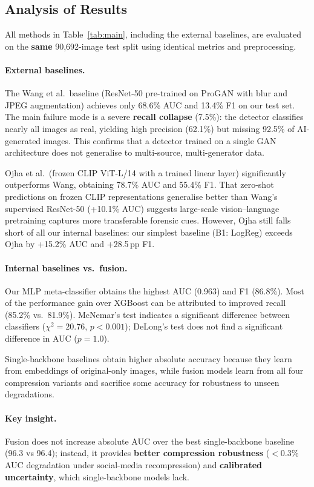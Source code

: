\subsection{Analysis of Results}

All methods in Table~\ref{tab:main}, including the external baselines, are evaluated on the \textbf{same} 90,692-image test split using identical metrics and preprocessing.

\paragraph{External baselines.}
The Wang et al.\ baseline (ResNet-50 pre-trained on ProGAN with blur and JPEG augmentation) achieves only 68.6\% AUC and 13.4\% F1 on our test set. The main failure mode is a severe \textbf{recall collapse} (7.5\%): the detector classifies nearly all images as real, yielding high precision (62.1\%) but missing 92.5\% of AI-generated images. This confirms that a detector trained on a single GAN architecture does not generalise to multi-source, multi-generator data.

Ojha et al.\ (frozen CLIP ViT-L/14 with a trained linear layer) significantly outperforms Wang, obtaining 78.7\% AUC and 55.4\% F1. That zero-shot predictions on frozen CLIP representations generalise better than Wang's supervised ResNet-50 (+10.1\% AUC) suggests large-scale vision--language pretraining captures more transferable forensic cues. However, Ojha still falls short of all our internal baselines: our simplest baseline (B1: LogReg) exceeds Ojha by +15.2\% AUC and +28.5\,pp F1.

\paragraph{Internal baselines vs.\ fusion.}
Our MLP meta-classifier obtains the highest AUC (0.963) and F1 (86.8\%). Most of the performance gain over XGBoost can be attributed to improved recall (85.2\% vs.\ 81.9\%). McNemar's test indicates a significant difference between classifiers ($\chi^2 = 20.76$, $p < 0.001$); DeLong's test does not find a significant difference in AUC ($p = 1.0$).

Single-backbone baselines obtain higher absolute accuracy because they learn from embeddings of original-only images, while fusion models learn from all four compression variants and sacrifice some accuracy for robustness to unseen degradations.

\paragraph{Key insight.}
Fusion does not increase absolute AUC over the best single-backbone baseline (96.3 vs 96.4); instead, it provides \textbf{better compression robustness} ($<$0.3\% AUC degradation under social-media recompression) and \textbf{calibrated uncertainty}, which single-backbone models lack.
